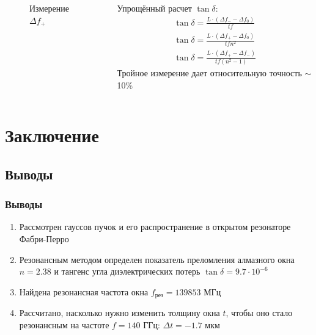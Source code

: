 \begin{frame}[c]
\begin{columns}[c]
\begin{column}{0.49\textwidth}
\begin{figure}[H]
				\caption{Измерение $\Delta f_+$}
				\label{fig:chem}
			\end{figure}
		\end{column}
		\begin{column}{0.49\textwidth}%
			Упрощённый расчет $\tan\delta$:
			\begin{gather*}
				\tan\delta=\frac{L\cdot(\Delta f_--\Delta f_0)}{tf}\\
				\tan\delta=\frac{L\cdot(\Delta f_+-\Delta f_0)}{tfn^2}\\
				\tan\delta=\frac{L\cdot(\Delta f_+-\Delta f_-)}{tf(n^2-1)}
			\end{gather*}
			Тройное измерение дает относительную точность $\sim$ 10\%
		\end{column}
	\end{columns}
		
\end{frame}

\section{Заключение}
\subsection{Выводы}
\begin{frame}
	\frametitle{Выводы}
	\begin{enumerate}
			\item Рассмотрен гауссов пучок и его распространение в открытом резонаторе Фабри-Перро
			\item Резонансным методом определен показатель преломления алмазного окна $n=2.38$ и тангенс угла диэлектрических потерь $\tan\delta=9.7\cdot10^{-6}$
			\item Найдена резонансная частота окна $f_\text{рез}=139853$ МГц
			\item Рассчитано, насколько нужно изменить толщину окна $t$, чтобы оно стало резонансным на частоте $f=140$ ГГц: $\Delta t=-1.7$ мкм 
	\end{enumerate}
\end{frame}
